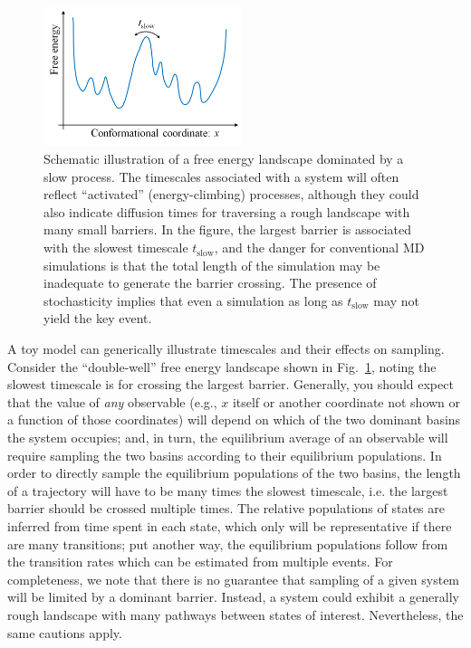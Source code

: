 


\begin{figure}
  \centering
  \includegraphics[width=5.8cm]{figures/1d-landscape-tslow}
  \caption{
  \label{fig:landscape} 
  Schematic illustration of a free energy landscape dominated by a slow process.
  The timescales associated with a system will often reflect ``activated'' (energy-climbing) processes, although they could also indicate diffusion times for traversing a rough landscape with many small barriers.
  In the figure, the largest barrier is associated with the slowest timescale $t_{\mathrm{slow}}$, and the danger for conventional MD simulations is that the total length of the simulation may be inadequate to generate the barrier crossing.
  The presence of stochasticity implies that even a simulation as long as $t_{\mathrm{slow}}$ may not yield the key event.
  }
\end{figure}

A toy model can generically illustrate timescales and their effects on sampling.
Consider the ``double-well'' free energy landscape shown in Fig.\ \ref{fig:landscape}, noting the slowest timescale is for crossing the largest barrier.  Generally, you should expect that the value of \emph{any} observable (e.g., $x$ itself or another coordinate not shown or a function of those coordinates) will depend on which of the two dominant basins the system occupies; and, in turn, the equilibrium average of an observable will require sampling the two basins according to their equilibrium populations.  In order to directly sample the equilibrium populations of the two basins, the length of a trajectory will have to be many times the slowest timescale, i.e. the largest barrier should be crossed multiple times.  The relative populations of states are inferred from time spent in each state, which only will be representative if there are many transitions;
put another way, the equilibrium populations follow from the transition rates \cite{Zuckerman2011} which can be estimated from multiple events.  For completeness, we note that there is no guarantee that sampling of a given system will be limited by a dominant barrier.  Instead, a system could exhibit a generally rough landscape with many pathways between states of interest.
Nevertheless, the same cautions apply.


